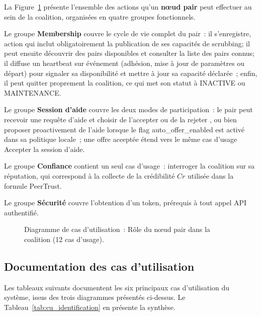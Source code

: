 La Figure~\ref{fig:uc_pair} présente l'ensemble des actions qu'un \textbf{nœud pair} peut effectuer au sein de la coalition, organisées en quatre groupes fonctionnels.

Le groupe \textbf{Membership} couvre le cycle de vie complet du pair~: il s'enregistre, action qui inclut obligatoirement la publication de ses capacités de scrubbing; il peut ensuite découvrir des pairs disponibles et consulter la liste des pairs connus; il diffuse un heartbeat sur événement (adhésion, mise à jour de paramètres ou départ) pour signaler sa disponibilité et mettre à jour sa capacité déclarée~; enfin, il peut quitter proprement la coalition, ce qui met son statut à {INACTIVE} ou {MAINTENANCE}.

Le groupe \textbf{Session d'aide} couvre les deux modes de participation~: le pair peut recevoir une requête d'aide  et choisir de l'accepter  ou de la rejeter , ou bien proposer proactivement de l'aide  lorsque le flag {auto\_offer\_enabled} est activé dans sa politique locale~; une offre acceptée étend vers le même cas d'usage Accepter la session d'aide.

Le groupe \textbf{Confiance} contient un seul cas d'usage~: interroger la coalition sur sa réputation, qui correspond à la collecte de la crédibilité $Cr$ utilisée dans la formule PeerTrust.

Le groupe \textbf{Sécurité} couvre l'obtention d'un token, prérequis à tout appel API authentifié.

\begin{figure}[H]
\centering
{}
\caption{Diagramme de cas d'utilisation~: Rôle du nœud pair dans la coalition (12 cas d'usage).}
\label{fig:uc_pair}
\end{figure}

\subsection{Documentation des cas d'utilisation}
\label{subsec:cu_doc}

Les tableaux suivants documentent les six principaux cas d'utilisation du système, issus des trois diagrammes présentés ci-dessus. Le Tableau~\ref{tab:cu_identification} en présente la synthèse.

